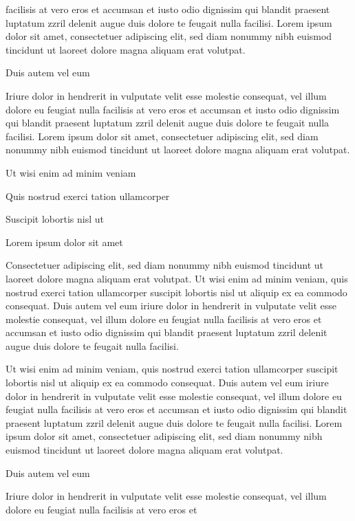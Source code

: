 \documentclass[11pt]{article}\makeatletter
\begin{document}
      facilisis at vero eros et accumsan et iusto odio dignissim qui blandit
      praesent luptatum zzril delenit augue duis dolore te feugait nulla
      facilisi. Lorem ipsum dolor sit amet, consectetuer adipiscing elit,
      sed diam nonummy nibh euismod tincidunt ut laoreet dolore magna
      aliquam erat volutpat. \par Duis autem vel eum \par Iriure dolor in hendrerit in vulputate velit esse molestie
      consequat, vel illum dolore eu feugiat nulla facilisis at vero eros et
      accumsan et iusto odio dignissim qui blandit praesent luptatum zzril
      delenit augue duis dolore te feugait nulla facilisi. Lorem ipsum dolor
      sit amet, consectetuer adipiscing elit, sed diam nonummy nibh euismod
      tincidunt ut laoreet dolore magna aliquam erat volutpat. \par Ut wisi enim ad minim veniam\par Quis nostrud exerci tation ullamcorper \par Suscipit lobortis nisl ut \par Lorem ipsum dolor sit amet\par Consectetuer adipiscing elit, sed diam nonummy nibh euismod
      tincidunt ut laoreet dolore magna aliquam erat volutpat. Ut wisi enim
      ad minim veniam, quis nostrud exerci tation ullamcorper suscipit
      lobortis nisl ut aliquip ex ea commodo consequat. Duis autem vel eum
      iriure dolor in hendrerit in vulputate velit esse molestie consequat,
      vel illum dolore eu feugiat nulla facilisis at vero eros et accumsan
      et iusto odio dignissim qui blandit praesent luptatum zzril delenit
      augue duis dolore te feugait nulla facilisi.\par Ut wisi enim ad minim veniam, quis nostrud exerci tation
      ullamcorper suscipit lobortis nisl ut aliquip ex ea commodo
      consequat. Duis autem vel eum iriure dolor in hendrerit in vulputate
      velit esse molestie consequat, vel illum dolore eu feugiat nulla
      facilisis at vero eros et accumsan et iusto odio dignissim qui blandit
      praesent luptatum zzril delenit augue duis dolore te feugait nulla
      facilisi. Lorem ipsum dolor sit amet, consectetuer adipiscing elit,
      sed diam nonummy nibh euismod tincidunt ut laoreet dolore magna
      aliquam erat volutpat. \par Duis autem vel eum \par Iriure dolor in hendrerit in vulputate velit esse molestie
      consequat, vel illum dolore eu feugiat nulla facilisis at vero eros et
\end{document}

